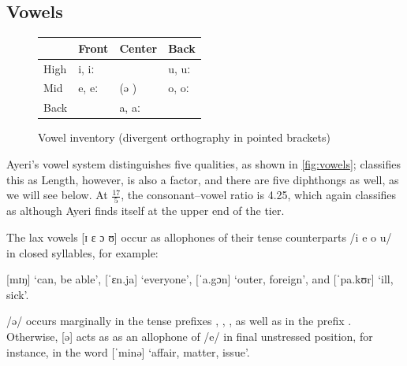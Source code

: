 %
%

\subsection{Vowels}

%
\begin{figure}[ht]\centering
\caption[Vowel inventory]{Vowel inventory (divergent orthography in pointed brackets)}
\begin{tabu} to .5\linewidth{H[1] X[2c] X[2c] X[2c]}
\toprule\tableheaderfont

	& Front
	& Center
	& Back
	\\

\toprule

High
	& i, iː 
	&
	& u, uː 
	\\

Mid
	& e, eː 
	& (ə )
	& o, oː 
	\\

Back
	&
	& a, aː 
	&
	\\

\bottomrule
\end{tabu}
\label{fig:vowels}
\end{figure}

Ayeri's vowel system distinguishes five qualities, as shown in 
\autoref{fig:vowels}; \citet{wals2} classifies this as 
Length, however, is also a factor, and there are five diphthongs as well, as we 
will see below. At $\frac{17}{5}$, the consonant--vowel ratio is 4.25, which 
\citet{wals3} again classifies as  although Ayeri finds 
itself at the upper end of the tier.

%
The lax vowels [ɪ ɛ ɔ ʊ] occur as allophones of their tense counterparts 
/i e o u/ in closed syllables, for example:

\pex
	\a {} [mɪŋ] `can, be able',
	\a {} [ˈɛn.ja] `everyone',
	\a {} [ˈa.gɔn] `outer, foreign', and
	\a {} [ˈpa.kʊr] `ill, sick'.
\xe

/ə/ occurs marginally in the tense prefixes , 
, , as well as in the prefix 
. Otherwise, [ə] acts as as an allophone of /e/ 
in final unstressed position, for instance, in the word 
 [ˈminə] `affair, matter, issue'.

